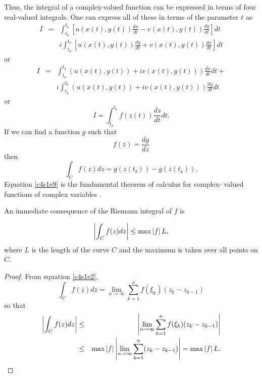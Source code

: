 Thus, the integral of a complex-valued function can be expressed in terms of
four real-valued integrals. One can express all of these in terms of the
parameter $t$ as
\begin{eqnarray}\label{c4s1e5}
I &=& \int_{t_a}^{t_b}\left[
u(x(t), y(t))\frac{dx}{dt} - v(x(t),y(t))\frac{dy}{dt}\right]dt \nonumber \\
 & &i\int_{t_a}^{t_b}\left[u(x(t),y(t))\frac{dy}{dt} + v(x(t),y(t))\frac{dx}{dt}
     \right]dt
\end{eqnarray}
or
\begin{eqnarray}\label{c4s1e6}
I &=& \int_{t_a}^{t_b}\left(u(x(t),y(t)) + iv(x(t),y(t))\right)\frac{dx}{dt}dt
+ \nonumber \\
 & & i\int_{t_a}^{t_b}\left(u(x(t),y(t)) + iv(x(t),y(t))\right)\frac{dy}{dt}dt
\end{eqnarray}
or
\begin{equation}\label{c4s1e7}
I = \int_{t_a}^{t_b}f(z(t))\frac{dz}{dt}dt.
\end{equation}
If we can find a function $g$ such that
\begin{equation}\label{c4s1e8}
f(z) = \frac{dg}{dz}
\end{equation}
then
\begin{equation}\label{c4s1e9}
\int_C f(z)dz = g(z(t_b)) - g(z(t_a)).
\end{equation}
Equation \eqref{c4s1e9} is the fundamental theorem of calculus for complex-
valued functions of complex variables \cite{dk}.

An immediate consequence of the Riemann integral of $f$ is
\begin{thm}\label{c4s1t1}
\[
\left\vert{\int_C f(z)dz}\right\vert \le \max\left\vert{f}\right\vert L,
\]
where $L$ is the length of the curve $C$ and the maximum is taken over all
points on $C$.
\end{thm}
\begin{proof}
From equation \eqref{c4s1e2},
\[
\int_C f(z)dz = \lim_{n \rightarrow \infty}\sum_{k=1}^n f(\xi_k)(z_k - z_{k-1})
\]
so that
\begin{eqnarray*}
\left\vert{\int_C f(z)dz}\right\vert &\le&
\left\vert{\lim_{n \rightarrow \infty}\sum_{k=1}^n f(\xi_k)(z_k - z_{k-1})}\right\vert \\
 &\le& \max\left\vert{f}\right\vert\left\vert{\lim_{n \rightarrow \infty}\sum_{k=1}^n(z_k - z_{k-1})}\right\vert
= \max\left\vert{f}\right\vert L.
\end{eqnarray*}
\end{proof}

